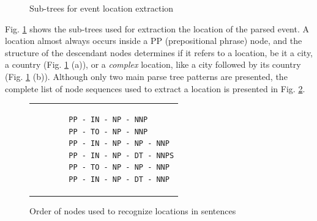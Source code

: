 \documentclass{llncs}
\begin{document}
\begin{figure}[h!]
	\centering
	\hspace{20mm}
	\caption{Sub-trees for event location extraction}
	\label{fig:location-extraction}
\end{figure}

Fig. \ref{fig:location-extraction} shows the sub-trees used for extraction the location of the parsed event. A location almost always occurs inside a PP (prepositional phrase) node, and the structure of the descendant nodes determines if it refers to a location, be it a city, a country (Fig. \ref{fig:location-extraction} (a)), or a \textit{complex} location, like a city followed by its country (Fig. \ref{fig:location-extraction} (b)). Although only two main parse tree patterns are presented, the complete list of node sequences used to extract a location is presented in Fig. \ref{fig:nodes-order}.

\begin{figure}[h!]
	\centering
	\begin{tabular}{p{4cm}}
		\begin{verbatim}
		PP - IN - NP - NNP
		PP - TO - NP - NNP
		PP - IN - NP - NP - NNP
		PP - IN - NP - DT - NNPS
		PP - TO - NP - NP - NNP
		PP - IN - NP - DT - NNP
		\end{verbatim}
	\end{tabular}
	\caption{Order of nodes used to recognize locations in sentences}
	\label{fig:nodes-order}
\end{figure}
\end{document}
